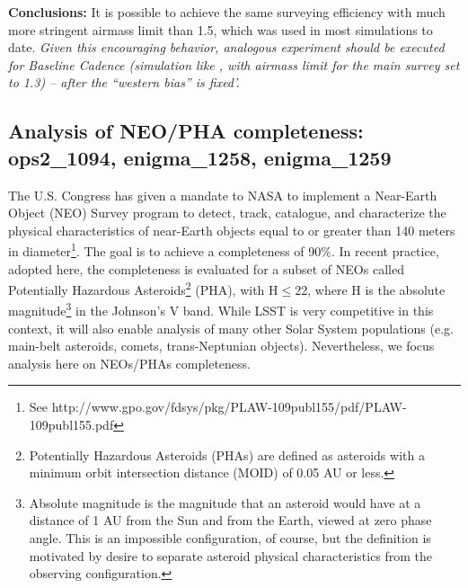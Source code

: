 {\bf Conclusions:}  It is possible to achieve the same surveying efficiency with
much more stringent airmass limit than 1.5, which was used in most simulations
to date.  {\it Given this encouraging behavior, analogous experiment should be
executed for Baseline Cadence (simulation like , with airmass limit
for the main survey set to 1.3) -- after the ``western bias'' is fixed'.}



\subsection{Analysis of NEO/PHA completeness:   ops2\_1094, enigma\_1258, enigma\_1259 \label{sec:NEOs}}

The U.S. Congress has given a mandate to NASA to implement a Near-Earth Object (NEO) Survey
program to detect, track, catalogue, and characterize the physical characteristics of near-Earth objects
equal to or greater than 140 meters in diameter\footnote{See http://www.gpo.gov/fdsys/pkg/PLAW-109publ155/pdf/PLAW-109publ155.pdf}. The goal is
to achieve a completeness of 90\%. In recent practice, adopted here, the completeness is evaluated for
a subset of NEOs called Potentially Hazardous Asteroids\footnote{
Potentially Hazardous Asteroids (PHAs) are defined as asteroids with a minimum orbit intersection
distance (MOID) of 0.05 AU or less.}  (PHA), with H$\le$22, where H is the absolute
magnitude\footnote{Absolute magnitude is the magnitude that an asteroid would have at a distance of
1 AU from the Sun and from the Earth, viewed at zero phase angle. This is an impossible configuration,
of course, but the definition is motivated by desire to separate asteroid physical characteristics from
the observing configuration.} in the Johnson's V band. While LSST is very competitive in this context,
it will also enable analysis of many other Solar System populations (e.g. main-belt asteroids, comets,
trans-Neptunian objects). Nevertheless, we focus analysis here on NEOs/PHAs completeness.



